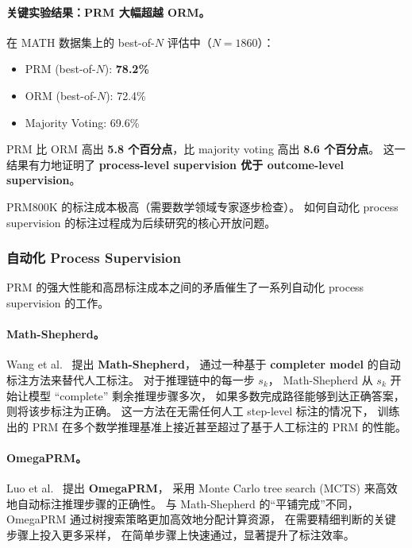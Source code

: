 \paragraph{关键实验结果：PRM 大幅超越 ORM。}
在 MATH 数据集上的 best-of-$N$ 评估中（$N = 1860$）：
\begin{itemize}[leftmargin=2em]
  \item PRM (best-of-$N$): \textbf{78.2\%}
  \item ORM (best-of-$N$): 72.4\%
  \item Majority Voting: 69.6\%
\end{itemize}

\noindent
PRM 比 ORM 高出 \textbf{5.8 个百分点}，比 majority voting 高出 \textbf{8.6 个百分点}。
这一结果有力地证明了 \textbf{process-level supervision 优于 outcome-level supervision}。

\begin{openproblembox}
PRM800K 的标注成本极高（需要数学领域专家逐步检查）。
如何自动化 process supervision 的标注过程成为后续研究的核心开放问题。
\end{openproblembox}

\subsubsection{自动化 Process Supervision}

PRM 的强大性能和高昂标注成本之间的矛盾催生了一系列自动化 process supervision 的工作。

\paragraph{Math-Shepherd。}
Wang et al.\ \cite{wang2024mathshepherd} 提出 \textbf{Math-Shepherd}，
通过一种基于 \textbf{completer model} 的自动标注方法来替代人工标注。
对于推理链中的每一步 $s_k$，
Math-Shepherd 从 $s_k$ 开始让模型 ``complete'' 剩余推理步骤多次，
如果多数完成路径能够到达正确答案，则将该步标注为正确。
这一方法在无需任何人工 step-level 标注的情况下，
训练出的 PRM 在多个数学推理基准上接近甚至超过了基于人工标注的 PRM 的性能。

\paragraph{OmegaPRM。}
Luo et al.\ \cite{luo2024omegaprm} 提出 \textbf{OmegaPRM}，
采用 Monte Carlo tree search (MCTS) 来高效地自动标注推理步骤的正确性。
与 Math-Shepherd 的``平铺完成''不同，
OmegaPRM 通过树搜索策略更加高效地分配计算资源，
在需要精细判断的关键步骤上投入更多采样，
在简单步骤上快速通过，显著提升了标注效率。


